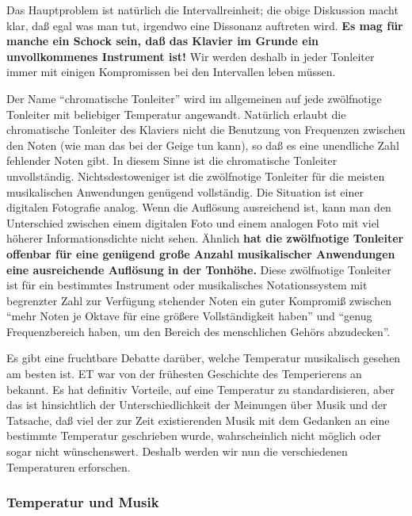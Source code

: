 Das Hauptproblem ist natürlich die Intervallreinheit; die obige Diskussion macht klar, daß egal was man tut, irgendwo eine Dissonanz auftreten wird.
\textbf{Es mag für manche ein Schock sein, daß das Klavier im Grunde ein unvollkommenes Instrument ist!}
Wir werden deshalb in jeder Tonleiter immer mit einigen Kompromissen bei den Intervallen leben müssen.

Der Name \enquote{chromatische Tonleiter} wird im allgemeinen auf jede zwölfnotige Tonleiter mit beliebiger Temperatur angewandt.
Natürlich erlaubt die chromatische Tonleiter des Klaviers nicht die Benutzung von Frequenzen zwischen den Noten (wie man das bei der Geige tun kann), so daß es eine unendliche Zahl fehlender Noten gibt.
In diesem Sinne ist die chromatische Tonleiter unvollständig.
Nichtsdestoweniger ist die zwölfnotige Tonleiter für die meisten musikalischen Anwendungen genügend vollständig.
Die Situation ist einer digitalen Fotografie analog.
Wenn die Auflösung ausreichend ist, kann man den Unterschied zwischen einem digitalen Foto und einem analogen Foto mit viel höherer Informationsdichte nicht sehen.
Ähnlich \textbf{hat die zwölfnotige Tonleiter offenbar für eine genügend große Anzahl musikalischer Anwendungen eine ausreichende Auflösung in der Tonhöhe.}
Diese zwölfnotige Tonleiter ist für ein bestimmtes Instrument oder musikalisches Notationssystem mit begrenzter Zahl zur Verfügung stehender Noten ein guter Kompromiß zwischen \enquote{mehr Noten je Oktave für eine größere Vollständigkeit haben} und \enquote{genug Frequenzbereich haben, um den Bereich des menschlichen Gehörs abzudecken}.

Es gibt eine fruchtbare Debatte darüber, welche Temperatur musikalisch gesehen am besten ist.
ET war von der frühesten Geschichte des Temperierens an bekannt.
Es hat definitiv Vorteile, auf eine Temperatur zu standardisieren, aber das ist hinsichtlich der Unterschiedlichkeit der Meinungen über Musik und der Tatsache, daß viel der zur Zeit existierenden Musik mit dem Gedanken an eine bestimmte Temperatur geschrieben wurde, wahrscheinlich nicht möglich oder sogar nicht wünschenswert.
Deshalb werden wir nun die verschiedenen Temperaturen erforschen.
 

\label{c2_2c}
\subsubsection{Temperatur und Musik}
\label{c2_2_temp}

